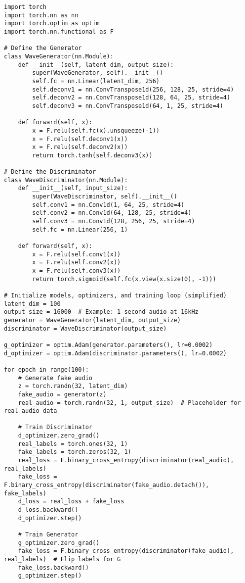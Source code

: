 \begin{lstlisting}[style=python]
import torch
import torch.nn as nn
import torch.optim as optim
import torch.nn.functional as F

# Define the Generator
class WaveGenerator(nn.Module):
    def __init__(self, latent_dim, output_size):
        super(WaveGenerator, self).__init__()
        self.fc = nn.Linear(latent_dim, 256)
        self.deconv1 = nn.ConvTranspose1d(256, 128, 25, stride=4)
        self.deconv2 = nn.ConvTranspose1d(128, 64, 25, stride=4)
        self.deconv3 = nn.ConvTranspose1d(64, 1, 25, stride=4)
    
    def forward(self, x):
        x = F.relu(self.fc(x).unsqueeze(-1))
        x = F.relu(self.deconv1(x))
        x = F.relu(self.deconv2(x))
        return torch.tanh(self.deconv3(x))

# Define the Discriminator
class WaveDiscriminator(nn.Module):
    def __init__(self, input_size):
        super(WaveDiscriminator, self).__init__()
        self.conv1 = nn.Conv1d(1, 64, 25, stride=4)
        self.conv2 = nn.Conv1d(64, 128, 25, stride=4)
        self.conv3 = nn.Conv1d(128, 256, 25, stride=4)
        self.fc = nn.Linear(256, 1)
    
    def forward(self, x):
        x = F.relu(self.conv1(x))
        x = F.relu(self.conv2(x))
        x = F.relu(self.conv3(x))
        return torch.sigmoid(self.fc(x.view(x.size(0), -1)))

# Initialize models, optimizers, and training loop (simplified)
latent_dim = 100
output_size = 16000  # Example: 1-second audio at 16kHz
generator = WaveGenerator(latent_dim, output_size)
discriminator = WaveDiscriminator(output_size)

g_optimizer = optim.Adam(generator.parameters(), lr=0.0002)
d_optimizer = optim.Adam(discriminator.parameters(), lr=0.0002)

for epoch in range(100):
    # Generate fake audio
    z = torch.randn(32, latent_dim)
    fake_audio = generator(z)
    real_audio = torch.randn(32, 1, output_size)  # Placeholder for real audio data
    
    # Train Discriminator
    d_optimizer.zero_grad()
    real_labels = torch.ones(32, 1)
    fake_labels = torch.zeros(32, 1)
    real_loss = F.binary_cross_entropy(discriminator(real_audio), real_labels)
    fake_loss = F.binary_cross_entropy(discriminator(fake_audio.detach()), fake_labels)
    d_loss = real_loss + fake_loss
    d_loss.backward()
    d_optimizer.step()
    
    # Train Generator
    g_optimizer.zero_grad()
    fake_loss = F.binary_cross_entropy(discriminator(fake_audio), real_labels)  # Flip labels for G
    fake_loss.backward()
    g_optimizer.step()
\end{lstlisting}

